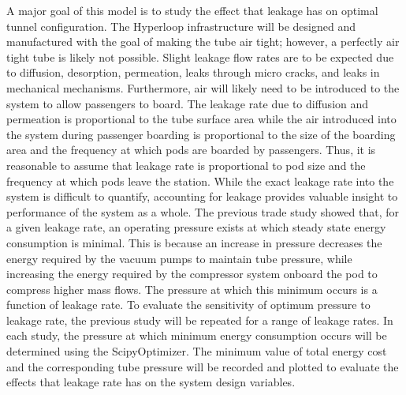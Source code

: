 A major goal of this model is to study the effect that leakage has on optimal
tunnel configuration. The Hyperloop infrastructure will be designed and
manufactured with the goal of making the tube air tight; however, a perfectly
air tight tube is likely not possible. Slight leakage flow rates are to be
expected due to diffusion, desorption, permeation, leaks through micro cracks,
and leaks in mechanical mechanisms. Furthermore, air will likely need to be
introduced to the system to allow passengers to board. The leakage rate due to
diffusion and permeation is proportional to the tube surface area while the air
introduced into the system during passenger boarding is proportional to the
size of the boarding area and the frequency at which pods are boarded by passengers.
Thus, it is reasonable to assume that leakage rate is proportional to pod size
and the frequency at which pods leave the station. While the exact leakage rate
into the system is difficult to quantify, accounting for leakage provides
valuable insight to performance of the system as a whole.
The previous trade study showed that, for a given leakage rate, an operating
pressure exists at which steady state energy consumption is minimal.
This is because an increase in pressure decreases the energy required by the
vacuum pumps to maintain tube pressure, while increasing the energy required by
the compressor system onboard the pod to compress higher mass flows.
The pressure at which this minimum occurs is a function of leakage rate.
To evaluate the sensitivity of optimum pressure to leakage rate, the previous
study will be repeated for a range of leakage rates. In each study, the
pressure at which minimum energy consumption occurs will be determined using
the ScipyOptimizer. The minimum value of total energy cost and the
corresponding tube pressure will be recorded and plotted to evaluate the
effects that leakage rate has on the system design variables.

